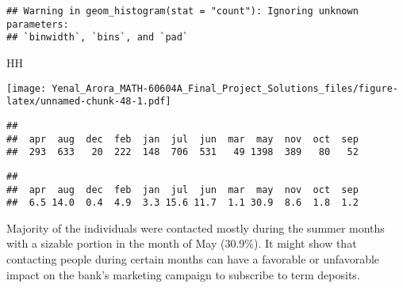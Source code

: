 \documentclass[
]{article}
\newenvironment{Shaded}{\begin{snugshade}}{\end{snugshade}}
\newcommand{\DecValTok}[1]{\textcolor[rgb]{0.00,0.00,0.81}{#1}}
\newcommand{\FunctionTok}[1]{\textcolor[rgb]{0.00,0.00,0.00}{#1}}
\newcommand{\NormalTok}[1]{#1}
\newcommand{\SpecialCharTok}[1]{\textcolor[rgb]{0.00,0.00,0.00}{#1}}
\begin{document}
\begin{verbatim}
## Warning in geom_histogram(stat = "count"): Ignoring unknown parameters:
## `binwidth`, `bins`, and `pad`
\end{verbatim}

\begin{Shaded}
\begin{Highlighting}[]
\NormalTok{HH}
\end{Highlighting}
\end{Shaded}

\texttt{[image: Yenal\_Arora\_MATH-60604A\_Final\_Project\_Solutions\_files/figure-latex/unnamed-chunk-48-1.pdf]}

\begin{Shaded}
\end{Shaded}

\begin{verbatim}
## 
##  apr  aug  dec  feb  jan  jul  jun  mar  may  nov  oct  sep 
##  293  633   20  222  148  706  531   49 1398  389   80   52
\end{verbatim}

\begin{Shaded}
\end{Shaded}

\begin{verbatim}
## 
##  apr  aug  dec  feb  jan  jul  jun  mar  may  nov  oct  sep 
##  6.5 14.0  0.4  4.9  3.3 15.6 11.7  1.1 30.9  8.6  1.8  1.2
\end{verbatim}

Majority of the individuals were contacted mostly during the summer
months with a sizable portion in the month of May (30.9\%). It might
show that contacting people during certain months can have a favorable
or unfavorable impact on the bank's marketing campaign to subscribe to
term deposits.
\end{document}
